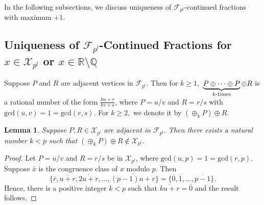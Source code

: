\documentclass[12pt]{elsarticle}
\newtheorem{lemma}[theorem]{Lemma}
\theoremstyle{definition}
\newcommand{\field}[1]{\mathbb{#1}}          \newcommand{\Q}{\field{Q}}
\newcommand{\R}{\field{R}}                   \newcommand{\Z}{\field{Z}}
\newcommand{\mX}{{\mathcal X}}
\newcommand{\f}{{\mathcal F}}
\begin{document}
In the following subsections, we discuss uniqueness of $\f_{p^l}$-continued fractions with maximum $+1.$

\subsection{Uniqueness of $\f_{p^l}$-Continued Fractions for  $x\in\mX_{p^l}$ or $x\in \R\setminus\Q$ }

\vspace{2mm}
Suppose $P$ and $R$ are adjacent vertices in $\f_{p^l}$. Then for $k\ge1,$ $\underbrace{P\oplus\cdots\oplus P}_{k\textnormal{-times}}\oplus R$ is a rational number of the form $\frac{ku+r}{kv+s}$, where $P=u/v$ and $R=r/s$ with $\mathrm{gcd}(u,v)=1=\mathrm{gcd}(r,s).$ For $k\ge2,$ we denote it by $(\oplus_k P)\oplus R$. 
\vspace{2mm}

\begin{lemma}\label{k-thfareysum}
	Suppose $P,R\in\mX_{p^l}$ are adjacent in $\f_{p^l}.$ Then there exists a natural number $k<p$ such that $(\oplus_k P)\oplus R\not\in\mX_{p^l}$.
\end{lemma}
\begin{proof}
	Let $P=u/v$ and $R=r/s$ be in $\mX_{p^l}$, where $\mathrm{gcd}(u,p)=1=\mathrm{gcd}(r,p).$ Suppose $\bar{x}$ is the congruence class of $x$ modulo $p.$ Then $$\{\overline{r},\overline{u+r},\overline{2u+r},\dots, \overline{(p-1)u+r}\}=\{\overline{0},\overline{1},\dots, \overline{p-1}\}.$$
	Hence, there is a positive integer $k<p$ such that $\overline{ku+r}=\overline{0}$ and the result follows.
\end{proof}	
\end{document}
